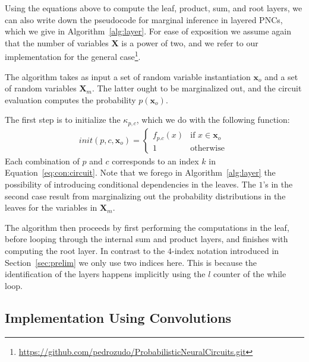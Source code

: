 \documentclass[letterpaper]{article} %
\newcommand{\Xvars}{\ensuremath{\mathbf{X}}}
\newcommand{\xvars}{\ensuremath{\mathbf{x}}}
\newcommand{\xvar}{\ensuremath{x}}
\newcommand{\component}{\ensuremath{{\kappa}}}
\begin{document}
Using the equations above to compute the leaf, product, sum, and root layers, we can also write down the pseudocode for marginal inference in layered PNCs, which we give in Algorithm~\ref{alg:layer}.
For ease of exposition we assume again that the number of variables $\Xvars$ is a power of two, and we refer to our implementation for the general case\footnote{\url{https://github.com/pedrozudo/ProbabilisticNeuralCircuits.git}}.






The algorithm takes as input a set of random variable instantiation $\xvars_o$ and a set of random variables $\Xvars_m$. The latter ought to be marginalized out, and the circuit evaluation computes the probability $p(\xvars_o)$.

The first step is to initialize the $\component_{p,c}$, which we do with the following function:
\begin{align}
	init(p,c,\xvars_o)
	=
	\begin{cases}
		f_{p.c}(\xvar) & \text{if $\xvar \in \xvars_o$  } \\
		1              & \text{otherwise}
	\end{cases}
\end{align}
Each combination of $p$ and $c$ corresponds to an index $k$ in Equation~\ref{eq:con:circuit}. Note that we forego in Algorithm~\ref{alg:layer} the possibility of introducing conditional dependencies in the leaves. The $1$'s in the second case result from marginalizing out the probability distributions in the leaves for the variables in $\Xvars_m$.





The algorithm then proceeds by first performing the computations in the leaf, before looping through the internal sum and product layers, and finishes with computing the root layer.
In contrast to the $4$-index notation introduced in Section~\ref{sec:prelim} we only use two indices here. This is because the identification of the layers happens implicitly using the $l$ counter of the while loop.






\subsection{Implementation Using Convolutions}
\end{document}
